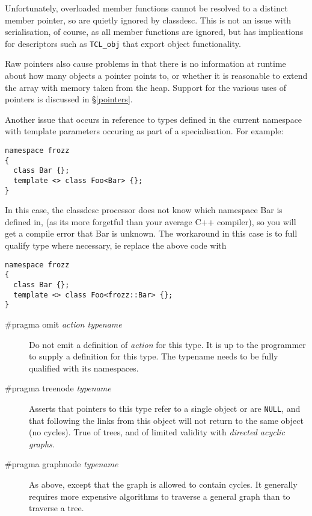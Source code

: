 Unfortunately, overloaded member functions cannot be
resolved to a distinct member pointer, so are quietly ignored by
classdesc. This is not an issue with serialisation, of course, as all
member functions are ignored, but has implications for descriptors such as
\verb+TCL_obj+ that export object functionality.

Raw pointers also cause problems in that there is no information at
runtime about how many objects a pointer points to, or whether it is reasonable
to extend the array with memory taken from the heap. Support for the
various uses of pointers is discussed in \S\ref{pointers}.

Another issue that occurs in reference to types defined in the current
namespace with template parameters occuring as part of a
specialisation. For example:
\begin{verbatim}
namespace frozz
{
  class Bar {};
  template <> class Foo<Bar> {};
}
\end{verbatim}
In this case, the classdesc processor does not know which namespace
Bar is defined in, (as its more forgetful than your average C++
compiler), so you will get a compile error that Bar is unknown. The
workaround in this case is to full qualify type where necessary, ie
replace the above code with
\begin{verbatim}
namespace frozz
{
  class Bar {};
  template <> class Foo<frozz::Bar> {};
}
\end{verbatim}



\begin{description}
\item[\#pragma omit {\em action typename}] Do not emit a definition of
{\em action} for this type. It is up to the programmer to supply a
definition for this type. The typename needs to be fully qualified
with its namespaces.
\item[\#pragma treenode {\em typename}] Asserts that pointers to this
type refer to a single object or are {\tt NULL}, and that following
the links from this object will not return to the same object (no
cycles). True of trees, and of limited validity with {\em directed
acyclic graphs}.
\item[\#pragma graphnode {\em typename}] As above, except that the
graph is allowed to contain cycles. It generally requires more
expensive algorithms to traverse a general graph than to traverse a tree.
\end{description}

